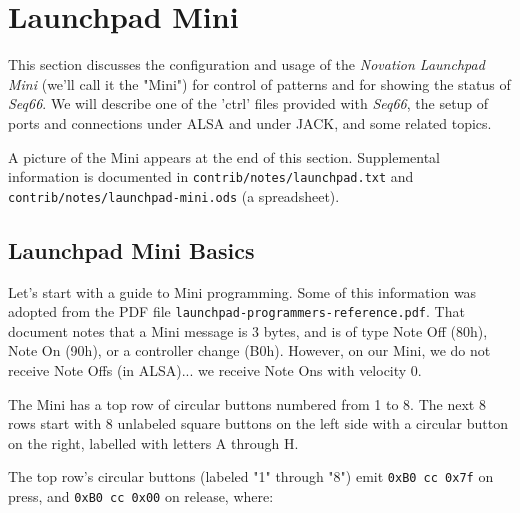 
%
%
%

\section{Launchpad Mini}
\label{sec:launchpad_mini}

   This section discusses the configuration and usage of the
   \textsl{Novation Launchpad Mini} (we'll call it the "Mini")
   for control of patterns
   and for showing the status of \textsl{Seq66}.
   We will describe one of the 'ctrl' files provided with \textsl{Seq66},
   the setup of ports and connections 
   under ALSA and under JACK, and some related topics.

   A picture of the Mini appears at the end of this section.
   Supplemental information is documented in
   \texttt{contrib/notes/launchpad.txt} and
   \texttt{contrib/notes/launchpad-mini.ods} (a spreadsheet).

\subsection{Launchpad Mini Basics}
\label{subsec:launchpad_mini_basics}

   Let's start with a guide to Mini programming.
   Some of this information was adopted from the PDF file
   \texttt{launchpad-programmers-reference.pdf}.
   That document notes that a Mini
   message is 3 bytes, and is of type Note Off (80h), Note On (90h), or a
   controller change (B0h).  However, on our Mini, we do not receive Note Offs
   (in ALSA)... we receive Note Ons with velocity 0.

   The Mini has a top row of circular buttons numbered from 1 to 8.
   The next 8 rows start with 8 unlabeled square buttons on the left side
   with a circular button on the right, labelled with letters A through H.

   The top row's circular buttons (labeled "1" through "8")
   emit \texttt{0xB0 cc 0x7f} on press, and
   \texttt{0xB0 cc 0x00} on release, where:

